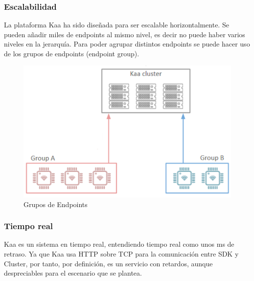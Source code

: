 \documentclass[12pt, twoside]{book}
\begin{document}
\subsubsection*{Escalabilidad}
La plataforma Kaa ha sido diseñada para ser escalable horizontalmente. Se pueden añadir miles de endpoints al mismo nivel, es decir no puede haber varios niveles en la jerarquía. Para poder agrupar distintos endpoints se puede hacer uso de los grupos de endpoints (endpoint group).
\begin{figure}[H]
\centering
\includegraphics[scale=0.6]{images/endpoint_group.png}
\caption{Grupos de Endpoints}\label{L508}
\end{figure}

\subsubsection*{Tiempo real}
Kaa es un sistema en tiempo real, entendiendo tiempo real como unos ms de retraso. Ya que Kaa usa HTTP sobre TCP para la comunicación entre SDK y Cluster, por tanto, por definición, es un servicio con retardos, aunque despreciables para el escenario que se plantea.
\end{document}
